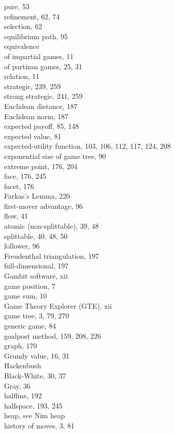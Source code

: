 \documentclass[12pt]{article}
\begin{document}
pure, 53\\
refinement, 62, 74\\
selection, 62\\
equilibrium path, 95\\
equivalence\\
of impartial games, 11\\
of partizan games, 25, 31\\
relation, 11\\
strategic, 239, 259\\
strong strategic, 241, 259\\
Euclidean distance, 187\\
Euclidean norm, 187\\
expected payoff, 85, 148\\
expected value, 81\\
expected-utility function, 103, 106, 112, 117, 124, 208\\
exponential size of game tree, 90\\
extreme point, 176, 204\\
face, 176, 245\\
facet, 176\\
Farkas's Lemma, 220\\
first-mover advantage, 96\\
flow, 41\\
atomic (non-splittable), 39, 48\\
splittable, 40, 48, 50\\
follower, 96\\
Freudenthal triangulation, 197\\
full-dimensional, 197\\
Gambit software, xii\\
game position, 7\\
game sum, 10\\
Game Theory Explorer (GTE), xii\\
game tree, 3, 79, 270\\
generic game, 84\\
goalpost method, 159, 208, 226\\
graph, 170\\
Grundy value, 16, 31\\
Hackenbush\\
Black-White, 30, 37\\
Gray, 36\\
halfline, 192\\
halfspace, 193, 245\\
heap, see Nim heap\\
history of moves, 3, 81
\end{document}
